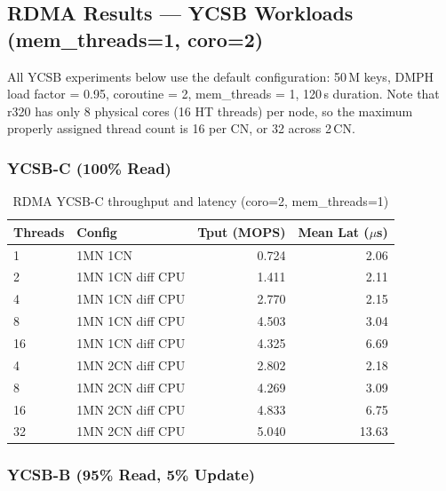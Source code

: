 \documentclass[11pt,a4paper]{article}
\begin{document}
\subsection{RDMA Results --- YCSB Workloads (mem\_threads=1, coro=2)}

All YCSB experiments below use the default configuration: 50\,M keys, DMPH load factor = 0.95, coroutine = 2, mem\_threads = 1, 120\,s duration. Note that r320 has only 8 physical cores (16 HT threads) per node, so the maximum properly assigned thread count is 16 per CN, or 32 across 2\,CN.

\subsubsection{YCSB-C (100\% Read)}

\begin{table}[H]
\centering
\caption{RDMA YCSB-C throughput and latency (coro=2, mem\_threads=1)}
\label{tab:rdma-ycsbc}
\small
\begin{tabular}{@{}llrr@{}}
\toprule
\textbf{Threads} & \textbf{Config} & \textbf{Tput (MOPS)} & \textbf{Mean Lat ($\mu$s)} \\
\midrule
1  & 1MN 1CN             & 0.724 & 2.06 \\
2  & 1MN 1CN diff CPU    & 1.411 & 2.11 \\
4  & 1MN 1CN diff CPU    & 2.770 & 2.15 \\
8  & 1MN 1CN diff CPU    & 4.503 & 3.04 \\
16 & 1MN 1CN diff CPU    & 4.325 & 6.69 \\
\midrule
4  & 1MN 2CN diff CPU    & 2.802 & 2.18 \\
8  & 1MN 2CN diff CPU    & 4.269 & 3.09 \\
16 & 1MN 2CN diff CPU    & 4.833 & 6.75 \\
32 & 1MN 2CN diff CPU    & 5.040 & 13.63 \\
\bottomrule
\end{tabular}
\end{table}

\subsubsection{YCSB-B (95\% Read, 5\% Update)}
\end{document}
